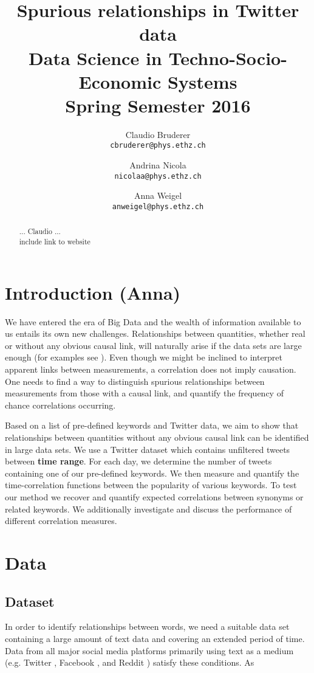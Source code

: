 \documentclass[12pt, a4paper]{article}
\author{
	Claudio Bruderer\\
	\texttt{cbruderer@phys.ethz.ch}
	\and
	Andrina Nicola\\
	\texttt{nicolaa@phys.ethz.ch}
	\and
	Anna Weigel\\
	\texttt{anweigel@phys.ethz.ch}
}
\title{Spurious relationships in Twitter data\\
	 	 \large Data Science in Techno-Socio-Economic Systems\\
	 	 \large Spring Semester 2016}
\begin{document}
\date{}
\maketitle

\begin{abstract}
... Claudio ...\\
include link to website
\end{abstract}


\vspace{0.2in}

\section{Introduction (Anna)}
We have entered the era of Big Data and the wealth of information available to us entails its own new challenges. Relationships between quantities, whether real or without any obvious causal link, will naturally arise if the data sets are large enough (for examples see \cite{tyler_vigen}). Even though we might be inclined to interpret apparent links between measurements, a correlation does not imply causation. One needs to find a way to distinguish spurious relationships between measurements from those with a causal link, and quantify the frequency of chance correlations occurring.

Based on a list of pre-defined keywords and Twitter data, we aim to show that relationships between quantities without any obvious causal link can be identified in large data sets. 
We use a Twitter dataset which contains unfiltered tweets between \textbf{time range}. For each day, we determine the number of tweets containing one of our pre-defined keywords. We then measure and quantify the time-correlation functions between the popularity of various keywords. To test our method we recover and quantify expected correlations between synonyms or related keywords. We  additionally investigate and discuss the performance of different correlation measures.

\section{Data}
\subsection{Dataset}
In order to identify relationships between words, we need a suitable data set containing a large amount of text data and covering an extended period of time. Data from all major social media platforms primarily using text as a medium (e.g. Twitter \cite{twitter}, Facebook \cite{facebook}, and Reddit \cite{reddit}) satisfy these conditions. As 
\end{document}
